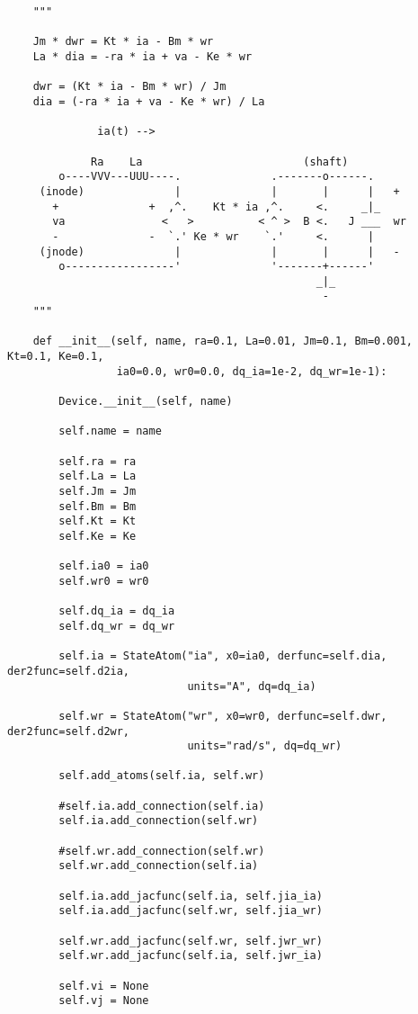 \begin{lstlisting}
    """

    Jm * dwr = Kt * ia - Bm * wr
    La * dia = -ra * ia + va - Ke * wr

    dwr = (Kt * ia - Bm * wr) / Jm
    dia = (-ra * ia + va - Ke * wr) / La

              ia(t) -->

             Ra    La                         (shaft)
        o----VVV---UUU----.              .-------o------.
     (inode)              |              |       |      |   +
       +              +  ,^.    Kt * ia ,^.     <.     _|_
       va               <   >          < ^ >  B <.   J ___  wr
       -              -  `.' Ke * wr    `.'     <.      |
     (jnode)              |              |       |      |   -
        o-----------------'              '-------+------'
                                                _|_
                                                 -
    """

    def __init__(self, name, ra=0.1, La=0.01, Jm=0.1, Bm=0.001, Kt=0.1, Ke=0.1,
                 ia0=0.0, wr0=0.0, dq_ia=1e-2, dq_wr=1e-1):

        Device.__init__(self, name)

        self.name = name

        self.ra = ra
        self.La = La
        self.Jm = Jm
        self.Bm = Bm
        self.Kt = Kt
        self.Ke = Ke

        self.ia0 = ia0
        self.wr0 = wr0

        self.dq_ia = dq_ia
        self.dq_wr = dq_wr

        self.ia = StateAtom("ia", x0=ia0, derfunc=self.dia, der2func=self.d2ia,
                            units="A", dq=dq_ia)

        self.wr = StateAtom("wr", x0=wr0, derfunc=self.dwr, der2func=self.d2wr,
                            units="rad/s", dq=dq_wr)

        self.add_atoms(self.ia, self.wr)

        #self.ia.add_connection(self.ia)
        self.ia.add_connection(self.wr)

        #self.wr.add_connection(self.wr)
        self.wr.add_connection(self.ia)

        self.ia.add_jacfunc(self.ia, self.jia_ia)
        self.ia.add_jacfunc(self.wr, self.jia_wr)

        self.wr.add_jacfunc(self.wr, self.jwr_wr)
        self.wr.add_jacfunc(self.ia, self.jwr_ia)

        self.vi = None
        self.vj = None


\end{lstlisting}
